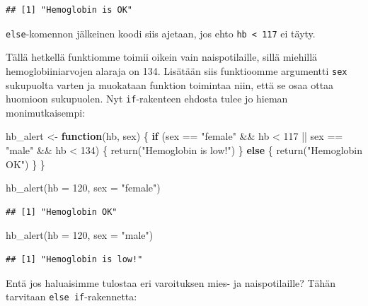 \documentclass[
]{book}
\newenvironment{Shaded}{\begin{snugshade}}{\end{snugshade}}
\newcommand{\AttributeTok}[1]{\textcolor[rgb]{0.77,0.63,0.00}{#1}}
\newcommand{\ControlFlowTok}[1]{\textcolor[rgb]{0.13,0.29,0.53}{\textbf{#1}}}
\newcommand{\DecValTok}[1]{\textcolor[rgb]{0.00,0.00,0.81}{#1}}
\newcommand{\FunctionTok}[1]{\textcolor[rgb]{0.00,0.00,0.00}{#1}}
\newcommand{\NormalTok}[1]{#1}
\newcommand{\OtherTok}[1]{\textcolor[rgb]{0.56,0.35,0.01}{#1}}
\newcommand{\SpecialCharTok}[1]{\textcolor[rgb]{0.00,0.00,0.00}{#1}}
\newcommand{\StringTok}[1]{\textcolor[rgb]{0.31,0.60,0.02}{#1}}
\begin{document}
\begin{verbatim}
## [1] "Hemoglobin is OK"
\end{verbatim}

\texttt{else}-komennon jälkeinen koodi siis ajetaan, jos ehto \texttt{hb\ \textless{}\ 117} ei täyty.

Tällä hetkellä funktiomme toimii oikein vain naispotilaille, sillä miehillä hemoglobiiniarvojen alaraja on 134. Lisätään siis funktioomme argumentti \texttt{sex} sukupuolta varten ja muokataan funktion toimintaa niin, että se osaa ottaa huomioon sukupuolen. Nyt \texttt{if}-rakenteen ehdosta tulee jo hieman monimutkaisempi:

\begin{Shaded}
\begin{Highlighting}[]
\NormalTok{hb\_alert }\OtherTok{\textless{}{-}} \ControlFlowTok{function}\NormalTok{(hb, sex) \{}
  \ControlFlowTok{if}\NormalTok{ (sex }\SpecialCharTok{==} \StringTok{"female"} \SpecialCharTok{\&\&}\NormalTok{ hb }\SpecialCharTok{\textless{}} \DecValTok{117} \SpecialCharTok{||}\NormalTok{ sex }\SpecialCharTok{==} \StringTok{"male"} \SpecialCharTok{\&\&}\NormalTok{ hb }\SpecialCharTok{\textless{}} \DecValTok{134}\NormalTok{) \{}
    \FunctionTok{return}\NormalTok{(}\StringTok{"Hemoglobin is low!"}\NormalTok{)}
\NormalTok{  \} }\ControlFlowTok{else}\NormalTok{ \{}
    \FunctionTok{return}\NormalTok{(}\StringTok{"Hemoglobin OK"}\NormalTok{)}
\NormalTok{  \}}
\NormalTok{\}}

\FunctionTok{hb\_alert}\NormalTok{(}\AttributeTok{hb =} \DecValTok{120}\NormalTok{, }\AttributeTok{sex =} \StringTok{"female"}\NormalTok{)}
\end{Highlighting}
\end{Shaded}

\begin{verbatim}
## [1] "Hemoglobin OK"
\end{verbatim}

\begin{Shaded}
\begin{Highlighting}[]
\FunctionTok{hb\_alert}\NormalTok{(}\AttributeTok{hb =} \DecValTok{120}\NormalTok{, }\AttributeTok{sex =} \StringTok{"male"}\NormalTok{)}
\end{Highlighting}
\end{Shaded}

\begin{verbatim}
## [1] "Hemoglobin is low!"
\end{verbatim}

Entä jos haluaisimme tulostaa eri varoituksen mies- ja naispotilaille? Tähän tarvitaan \texttt{else\ if}-rakennetta:
\end{document}

